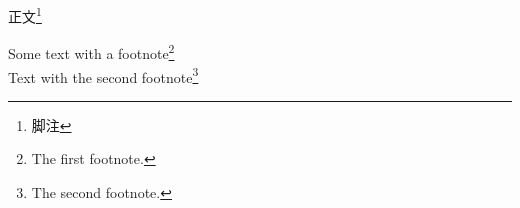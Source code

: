 \documentclass{ctexart}
\begin{document}
正文\footnote{脚注}

Some text with a footnote\footnote{The first footnote.}\\

Text with the second footnote\footnote[4]{The second footnote.}
\end{document}
